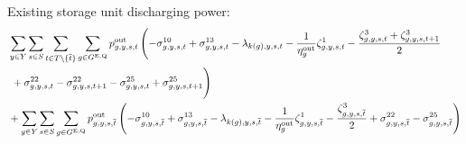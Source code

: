 \documentclass{article}
\newcommand{\sStorageExisting}{G^{\mathrm{E,Q}}}
\newcommand{\sYears}{Y}
\newcommand{\sScenarios}{S}
\newcommand{\sIntervals}{T}
\newcommand{\iGenerator}{g}
\newcommand{\iYear}{y}
\newcommand{\iScenario}{s}
\newcommand{\iInterval}{t}
\newcommand{\iIntervalTerminal}{\overline{\iInterval}}
\newcommand{\iZone}{z}
\newcommand{\cStorageUnitEfficiencyDischarging}{\eta_{\iGenerator}^{\mathrm{out}}}
\newcommand{\vPowerOut}[1][\iGenerator,\iYear,\iScenario,\iInterval]{p^{\mathrm{out}}_{#1}}
\newcommand{\dNonNegativeDischarging}[1][\iGenerator,\iYear,\iScenario,\iInterval]{\sigma_{#1}^{10}}
\newcommand{\dMaxDischargingRateExisting}[1][\iGenerator,\iYear,\iScenario,\iInterval]{\sigma_{#1}^{13}}
\newcommand{\dRampRateUpStorageDischarging}[1][\iGenerator,\iYear,\iScenario,\iInterval]{\sigma_{#1}^{22}}
\newcommand{\dRampRateDownStorageDischarging}[1][\iGenerator,\iYear,\iScenario,\iInterval]{\sigma_{#1}^{25}}
\newcommand{\dPowerBalance}[1][\iZone,\iYear,\iScenario,\iInterval]{\lambda_{#1}}
\newcommand{\dStorageEnergyTransition}[1][\iGenerator,\iYear,\iScenario,\iInterval]{\zeta_{#1}^{1}}
\newcommand{\dStorageEnergyOutput}[1][\iGenerator,\iYear,\iScenario,\iInterval]{\zeta_{#1}^{3}}
\begin{document}
Existing storage unit discharging power:
\begin{align}
	& \sum\limits_{\iYear \in \sYears}\sum\limits_{\iScenario \in \sScenarios}\sum\limits_{\iInterval \in \sIntervals \setminus \{\iIntervalTerminal\}} \sum\limits_{\iGenerator \in \sStorageExisting} \vPowerOut \left( - \dNonNegativeDischarging + \dMaxDischargingRateExisting - \dPowerBalance[k(\iGenerator),\iYear,\iScenario,\iInterval] - \frac{1}{\cStorageUnitEfficiencyDischarging} \dStorageEnergyTransition - \frac{\dStorageEnergyOutput + \dStorageEnergyOutput[\iGenerator,\iYear,\iScenario,\iInterval+1]}{2} \right.\nonumber\\
	& \left. \vphantom{\sum\limits_{}} + \dRampRateUpStorageDischarging - \dRampRateUpStorageDischarging[\iGenerator,\iYear,\iScenario,\iInterval+1] - \dRampRateDownStorageDischarging + \dRampRateDownStorageDischarging[\iGenerator,\iYear,\iScenario,\iInterval+1] \right)\\
	& + \sum\limits_{\iYear \in \sYears}\sum\limits_{\iScenario \in \sScenarios} \sum\limits_{\iGenerator \in \sStorageExisting} \vPowerOut[\iGenerator,\iYear,\iScenario,\iIntervalTerminal] \left( - \dNonNegativeDischarging[\iGenerator,\iYear,\iScenario,\iIntervalTerminal] + \dMaxDischargingRateExisting[\iGenerator,\iYear,\iScenario,\iIntervalTerminal] - \dPowerBalance[k(\iGenerator),\iYear,\iScenario,\iIntervalTerminal] - \frac{1}{\cStorageUnitEfficiencyDischarging} \dStorageEnergyTransition[\iGenerator,\iYear,\iScenario,\iIntervalTerminal] - \frac{\dStorageEnergyOutput[\iGenerator,\iYear,\iScenario,\iIntervalTerminal]}{2} + \dRampRateUpStorageDischarging[\iGenerator,\iYear,\iScenario,\iIntervalTerminal] - \dRampRateDownStorageDischarging[\iGenerator,\iYear,\iScenario,\iIntervalTerminal] \right)\\\nonumber
\end{align}
\end{document}
